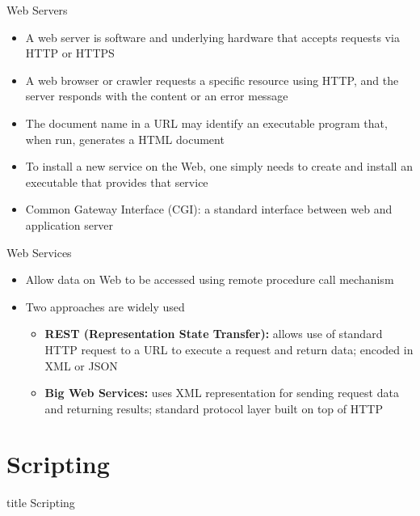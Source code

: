 \documentclass[aspectratio=169, xcolor=dvipsnames]{beamer}
\begin{document}
\begin{frame}{Web Servers}
    \begin{itemize}[<+->]
        \item A web server is software and underlying hardware that accepts requests via HTTP or HTTPS
        \item A web browser or crawler requests a specific resource using HTTP, and the server responds with the content or an error message
        \item The document name in a URL may identify an executable program that, when run, generates a HTML document
        \item To install a new service on the Web, one simply needs to create and install an executable that provides that service
        \item Common Gateway Interface (CGI): a standard interface between web and application server
    \end{itemize}
\end{frame}

\begin{frame}{Web Services}
    \begin{itemize}[<+->]
        \item Allow data on Web to be accessed using remote procedure call mechanism
        \item Two approaches are widely used
        \begin{itemize}
            \item[$\triangleright$] \textbf{REST (Representation State Transfer):} allows use of standard HTTP request to a URL to execute a request and return data; encoded in XML or JSON
            \item[$\triangleright$] \textbf{Big Web Services:} uses XML representation for sending request data and returning results; standard protocol layer built on top of HTTP
        \end{itemize}
    \end{itemize}
\end{frame}

\section{Scripting}
\begin{frame}
  \vfill
  \centering
  \begin{beamercolorbox}[sep=8pt,center,shadow=true,rounded=true]{title}
    Scripting\par%
  \end{beamercolorbox}
  \vfill
\end{frame}
\end{document}
